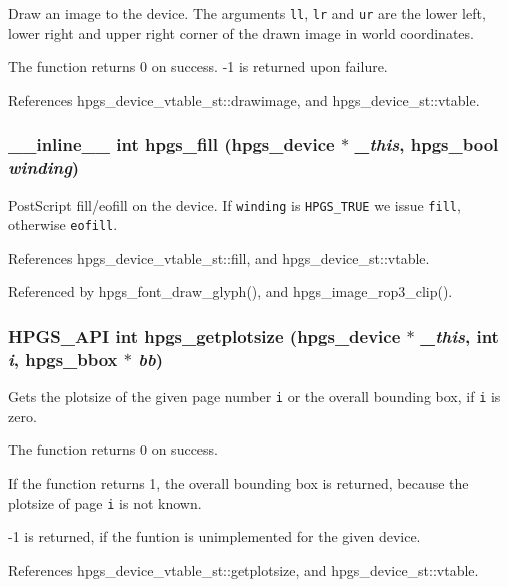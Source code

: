 Draw an image to the device. The arguments {\tt ll}, {\tt lr} and {\tt ur} are the lower left, lower right and upper right corner of the drawn image in world coordinates.

The function returns 0 on success. -1 is returned upon failure. 

References hpgs\_\-device\_\-vtable\_\-st::drawimage, and hpgs\_\-device\_\-st::vtable.
\subsubsection[hpgs\_\-fill]{\setlength{\rightskip}{0pt plus 5cm}\_\-\_\-inline\_\-\_\- int hpgs\_\-fill ({\bf hpgs\_\-device} $\ast$ {\em \_\-this}, \/  hpgs\_\-bool {\em winding})\hspace{0.3cm}{\tt  [static]}}\label{group__device_g089db13124aa75a45a6e913aca62e4d4}


PostScript fill/eofill on the device. If {\tt winding} is {\tt HPGS\_\-TRUE} we issue {\tt fill}, otherwise {\tt eofill}. 

References hpgs\_\-device\_\-vtable\_\-st::fill, and hpgs\_\-device\_\-st::vtable.

Referenced by hpgs\_\-font\_\-draw\_\-glyph(), and hpgs\_\-image\_\-rop3\_\-clip().
\subsubsection[hpgs\_\-getplotsize]{\setlength{\rightskip}{0pt plus 5cm}HPGS\_\-API int hpgs\_\-getplotsize ({\bf hpgs\_\-device} $\ast$ {\em \_\-this}, \/  int {\em i}, \/  {\bf hpgs\_\-bbox} $\ast$ {\em bb})}\label{group__device_g409181ae96a9c9fe88bc4327552ac242}


Gets the plotsize of the given page number {\tt i} or the overall bounding box, if {\tt i} is zero.

The function returns 0 on success.

If the function returns 1, the overall bounding box is returned, because the plotsize of page {\tt i} is not known.

-1 is returned, if the funtion is unimplemented for the given device. 

References hpgs\_\-device\_\-vtable\_\-st::getplotsize, and hpgs\_\-device\_\-st::vtable.

